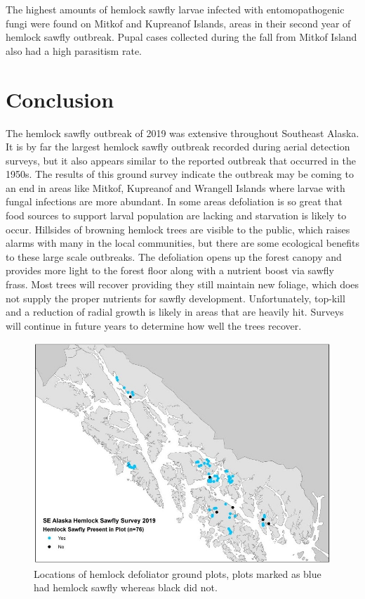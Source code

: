 \begin{multicols}{2}
The highest amounts of hemlock sawfly larvae infected with entomopathogenic fungi were found on Mitkof and Kupreanof Islands, areas in their second year of hemlock sawfly outbreak.  Pupal cases collected during the fall from Mitkof Island also had a high parasitism rate.

\section{Conclusion}

The hemlock sawfly outbreak of 2019 was extensive throughout Southeast Alaska.  It is by far the largest hemlock sawfly outbreak recorded during aerial detection surveys, but it also appears similar to the reported outbreak that occurred in the 1950s.  The results of this ground survey indicate the outbreak may be coming to an end in areas like Mitkof, Kupreanof and Wrangell Islands where larvae with fungal infections are more abundant.  In some areas defoliation is so great that food sources to support larval population are lacking and starvation is likely to occur.  Hillsides of browning hemlock trees are visible to the public, which raises alarms with many in the local communities, but there are some ecological benefits to these large scale outbreaks.  The defoliation opens up the forest canopy and provides more light to the forest floor along with a nutrient boost via sawfly frass.  Most trees will recover providing they still maintain new foliage, which does not supply the proper nutrients for sawfly development.  Unfortunately, top-kill and a reduction of radial growth is likely in areas that are heavily hit.  Surveys will continue in future years to determine how well the trees recover. 

\end{multicols}
\begin{figure}[H]
\begin{center}
\includegraphics[width=16cm]{img/hemlock_sawfly_plot_map.jpg}
\caption{Locations of hemlock defoliator ground plots, plots marked as blue had hemlock sawfly whereas black did not.}
\label{hemlock_sawfly_plot_map}
\end{center}
\end{figure} 
